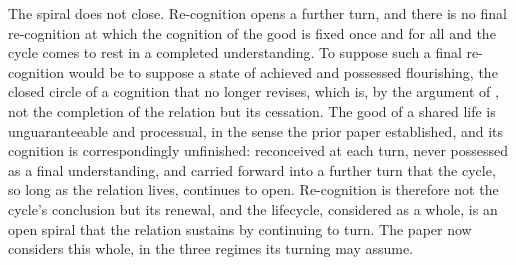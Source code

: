 The spiral does not close. Re-cognition opens a further turn, and there is no final re-cognition at which the cognition of the good is fixed once and for all and the cycle comes to rest in a completed understanding. To suppose such a final re-cognition would be to suppose a state of achieved and possessed flourishing, the closed circle of a cognition that no longer revises, which is, by the argument of , not the completion of the relation but its cessation. The good of a shared life is unguaranteeable and processual, in the sense the prior paper established, and its cognition is correspondingly unfinished: reconceived at each turn, never possessed as a final understanding, and carried forward into a further turn that the cycle, so long as the relation lives, continues to open. Re-cognition is therefore not the cycle's conclusion but its renewal, and the lifecycle, considered as a whole, is an open spiral that the relation sustains by continuing to turn. The paper now considers this whole, in the three regimes its turning may assume.
